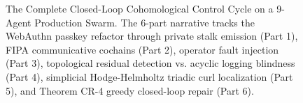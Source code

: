 \begin{figure}[p]
\caption{The Complete Closed-Loop Cohomological Control Cycle on a 9-Agent Production Swarm. The 6-part narrative tracks the WebAuthn passkey refactor through private stalk emission (Part 1), FIPA communicative cochains (Part 2), operator fault injection (Part 3), topological residual detection vs. acyclic logging blindness (Part 4), simplicial Hodge-Helmholtz triadic curl localization (Part 5), and Theorem CR-4 greedy closed-loop repair (Part 6).}
\label{fig:full-cycle-narrative}
\end{figure}
